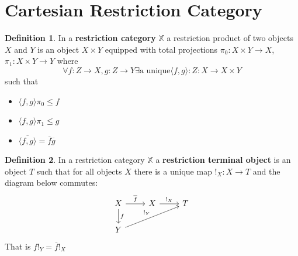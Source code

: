\documentclass[11pt, oneside]{amsart}
\theoremstyle{definition}
\newtheorem{definition}{Definition}[section]
\theoremstyle{definition}
\begin{document}
\section{Cartesian Restriction Category}
\begin{definition}
 In a \textbf{restriction category} $\mathbb{X}$ a restriction product of two objects $X$ and $Y$ is an object $X\times Y$ equipped with total projections $\pi_{0}: X \times Y \to X$, $\pi_{1}:X \times Y \to Y $ where\\
\begin{equation*}
\forall f: Z \to X, g: Z \to Y \exists \text{a unique} \langle{f,g}\rangle : Z: X \to X \times Y 
\end{equation*}
such that
\begin{itemize}
    \item $\langle{f,g}\rangle\pi_{0}\leq f$
    \item $\langle{f,g}\rangle\pi_{1}\leq g$
    \item $\overline{\langle{f,g}\rangle}=\overline{f}\overline{g}$
\end{itemize}
\end{definition}
\begin{definition}
 In a restriction category $\mathbb{X}$ a \textbf{restriction terminal object} is an object $T$ such that for all objects $X$ there is a unique map $!_{X}: X \to T$ and the diagram below commutes:\\
\begin{equation*}
\begin{tikzcd}
X \arrow[r, "\overline{f}"] \arrow[d, "f"] & X \arrow[r, "!_{X}"] & T \\
Y \arrow[rru, "!_{Y}"]                     &                      &  
\end{tikzcd}
\end{equation*}
That is $f!_{Y}=\overline{f}!_{X}$\\
\end{definition}
\end{document}
